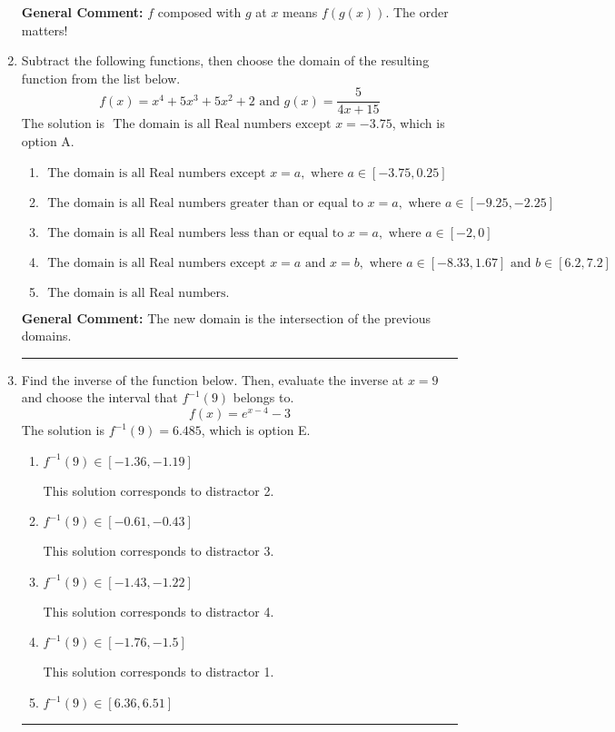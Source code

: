 \documentclass{extbook}[14pt]
\newcommand{\litem}[1]{\item #1

\rule{\textwidth}{0.4pt}}
\begin{document}
\begin{enumerate}
{\begin{enumerate}[label=\Alph*.]
\end{enumerate}

\textbf{General Comment:} $f$ composed with $g$ at $x$ means $f(g(x))$. The order matters!
}
\litem{
Subtract the following functions, then choose the domain of the resulting function from the list below.
\[ f(x) = x^{4} +5 x^{3} +5 x^{2} + 2 \text{ and } g(x) = \frac{5}{4x+15} \]The solution is \( \text{ The domain is all Real numbers except } x = -3.75 \), which is option A.\begin{enumerate}[label=\Alph*.]
\item \( \text{ The domain is all Real numbers except } x = a, \text{ where } a \in [-3.75, 0.25] \)


\item \( \text{ The domain is all Real numbers greater than or equal to } x = a, \text{ where } a \in [-9.25, -2.25] \)


\item \( \text{ The domain is all Real numbers less than or equal to } x = a, \text{ where } a \in [-2, 0] \)


\item \( \text{ The domain is all Real numbers except } x = a \text{ and } x = b, \text{ where } a \in [-8.33, 1.67] \text{ and } b \in [6.2, 7.2] \)


\item \( \text{ The domain is all Real numbers. } \)


\end{enumerate}

\textbf{General Comment:} The new domain is the intersection of the previous domains.
}
\litem{
Find the inverse of the function below. Then, evaluate the inverse at $x = 9$ and choose the interval that $f^{-1}(9)$ belongs to.
\[ f(x) = e^{x-4}-3 \]The solution is \( f^{-1}(9) = 6.485 \), which is option E.\begin{enumerate}[label=\Alph*.]
\item \( f^{-1}(9) \in [-1.36, -1.19] \)

 This solution corresponds to distractor 2.
\item \( f^{-1}(9) \in [-0.61, -0.43] \)

 This solution corresponds to distractor 3.
\item \( f^{-1}(9) \in [-1.43, -1.22] \)

 This solution corresponds to distractor 4.
\item \( f^{-1}(9) \in [-1.76, -1.5] \)

 This solution corresponds to distractor 1.
\item \( f^{-1}(9) \in [6.36, 6.51] \)


\end{enumerate}}
\end{enumerate}
\end{document}
